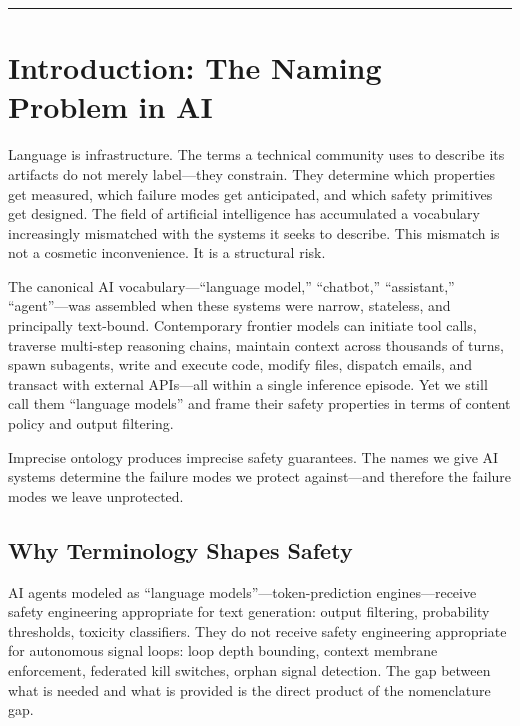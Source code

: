 \documentclass[11pt,a4paper]{article}
\begin{document}
\noindent\rule{\linewidth}{0.6pt}\vspace{4pt}

\tableofcontents\newpage

\section{Introduction: The Naming Problem in AI}

Language is infrastructure. The terms a technical community uses to describe its artifacts
do not merely label---they constrain. They determine which properties get measured, which failure
modes get anticipated, and which safety primitives get designed. The field of artificial
intelligence has accumulated a vocabulary increasingly mismatched with the systems it seeks to
describe. This mismatch is not a cosmetic inconvenience. It is a structural risk.

The canonical AI vocabulary---``language model,'' ``chatbot,'' ``assistant,'' ``agent''---was
assembled when these systems were narrow, stateless, and principally text-bound. Contemporary
frontier models can initiate tool calls, traverse multi-step reasoning chains, maintain context
across thousands of turns, spawn subagents, write and execute code, modify files, dispatch
emails, and transact with external APIs---all within a single inference episode. Yet we still
call them ``language models'' and frame their safety properties in terms of content policy and
output filtering.

\begin{importantbox}
Imprecise ontology produces imprecise safety guarantees. The names we give AI systems determine
the failure modes we protect against---and therefore the failure modes we leave unprotected.
\end{importantbox}

\subsection{Why Terminology Shapes Safety}

AI agents modeled as ``language models''---token-prediction engines---receive safety engineering
appropriate for text generation: output filtering, probability thresholds, toxicity classifiers.
They do not receive safety engineering appropriate for autonomous signal loops: loop depth
bounding, context membrane enforcement, federated kill switches, orphan signal detection. The
gap between what is needed and what is provided is the direct product of the nomenclature gap.
\end{document}
